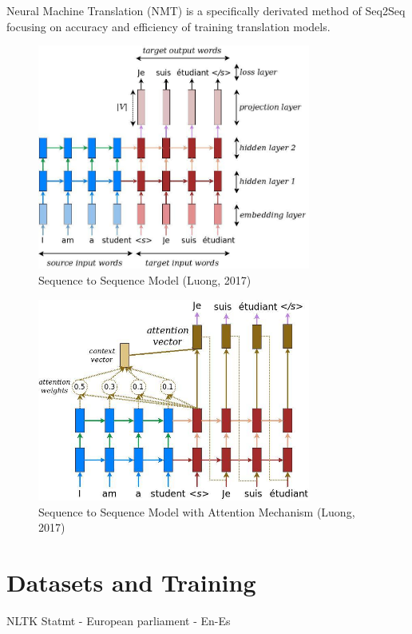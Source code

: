 \documentclass[10pt,a4paper]{report}
\begin{document}
Neural Machine Translation (NMT) is a specifically derivated method of Seq2Seq focusing on accuracy and efficiency of training translation models.
\clearpage

\begin{figure}
\begin{center}
\includegraphics[width=0.8\textwidth]{seq2seq.jpg}
\caption{Sequence to Sequence Model (Luong, 2017)}
\end{center}
\end{figure}

\begin{figure}
\begin{center}
\includegraphics[width=0.8\textwidth] {attention_mechanism.jpg}
\caption{Sequence to Sequence Model with Attention Mechanism (Luong, 2017)}
\end{center}
\end{figure}

\clearpage
\section{Datasets and Training}
NLTK
Statmt - European parliament - En-Es
\end{document}
